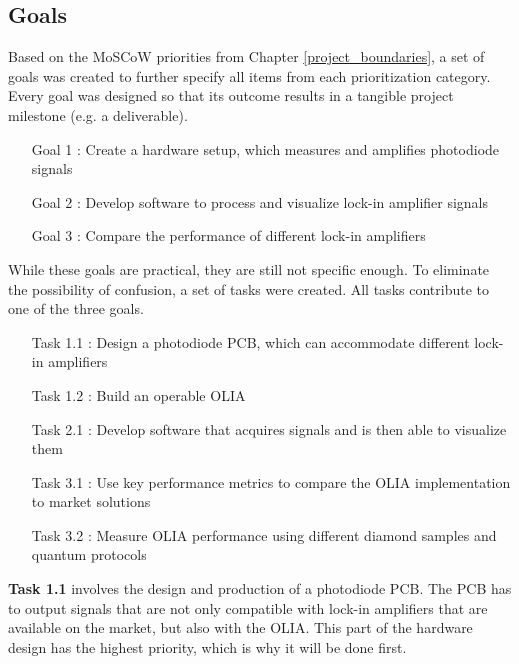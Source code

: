 \documentclass{report}
\begin{document}
	\subsection{Goals} \label{chap:goals}
	Based on the MoSCoW priorities from Chapter \ref{project_boundaries}, a set of goals was created to further specify all items from each prioritization category. Every goal was designed so that its outcome results in a tangible project milestone (e.g. a deliverable).
	
	\begin{itemize}
		\item[Goal 1]: Create a hardware setup, which measures and amplifies photodiode signals
		\item[Goal 2]: Develop software to process and visualize lock-in amplifier signals
		\item[Goal 3]: Compare the performance of different lock-in amplifiers
	\end{itemize}
	
	While these goals are practical, they are still not specific enough. To eliminate the possibility of confusion, a set of tasks were created. All tasks contribute to one of the three goals.
	
	\begin{itemize}
		\item[Task 1.1]: Design a photodiode PCB, which can accommodate different lock-in amplifiers
		\item[Task 1.2]: Build an operable OLIA
		\item[Task 2.1]: Develop software that acquires signals and is then able to visualize them
		\item[Task 3.1]: Use key performance metrics to compare the OLIA implementation to market solutions
		\item[Task 3.2]: Measure OLIA performance using different diamond samples and quantum protocols
	\end{itemize}
	
	\textbf{Task 1.1} involves the design and production of a photodiode PCB. The PCB has to output signals that are not only compatible with lock-in amplifiers that are available on the market, but also with the OLIA. This part of the hardware design has the highest priority, which is why it will be done first. 
	
\end{document}

